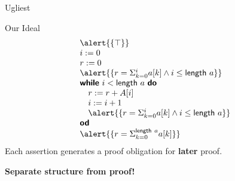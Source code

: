 \documentclass{beamer}
\begin{document}
\begin{frame}{Ugliest}
    \end{frame}
    \begin{frame}{Our Ideal}
\begin{displaymath}
    \begin{array}{l}
        \alert{\{ \top \}}\\
        i := 0\\
        r := 0\\
        \alert{\{ r = \Sigma_{k=0}^i a[k] \land i \leq \mathsf{length}\ a\}} \\
        \textbf{\textsf{while}}\ i < \textsf{length}\ a\ \textbf{\textsf{do}}\\
        \quad r := r + A[i]\\
        \quad i := i + 1\\
        \quad \alert{\{ r = \Sigma_{k=0}^i a[k] \land i \leq \mathsf{length}\ a\}} \\
        \textbf{\textsf{od}}\\ 
        \alert{\{ r = \Sigma_{k=0}^{\textsf{length}\ a} a[k] \}}
    \end{array}
\end{displaymath}\pause
Each assertion generates a proof obligation for \alert{\textbf{later}} proof.\pause
\begin{center}
    \textbf{Separate \alert{structure} from \alert{proof}!}
\end{center}
    \end{frame}
\end{document}
